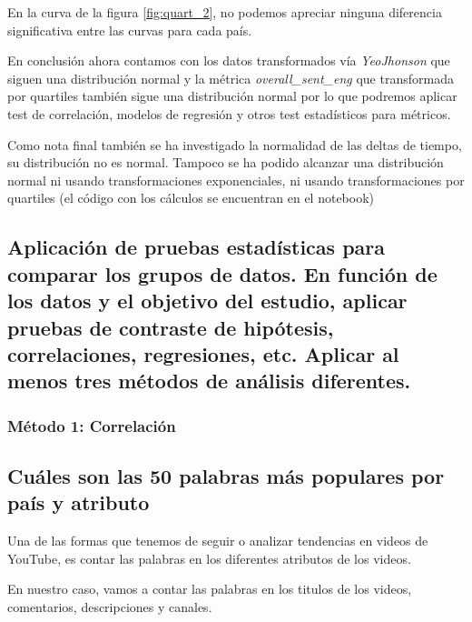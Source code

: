 \documentclass[a4paper,12pt]{article}
\begin{document}
En la curva de la figura \ref{fig:quart_2}, no podemos apreciar ninguna diferencia significativa entre las curvas para cada pa\'is.

En conclusi\'on ahora contamos con los datos transformados  v\'ia {\itshape Yeo\-Jhonson} que siguen una distribuci\'on normal y la m\'etrica {\itshape overall\_sent\_eng} que transformada por quartiles tambi\'en sigue una distribuci\'on normal por lo que podremos aplicar test de correlaci\'on, modelos de regresi\'on y otros test estad\'isticos para m\'etricos.

Como nota final tambi\'en se ha investigado la normalidad de las deltas de tiempo, su distribuci\'on no es normal. Tampoco se ha podido alcanzar una distribuci\'on normal ni usando transformaciones exponenciales, ni usando transformaciones por quartiles (el c\'odigo con los c\'alculos se encuentran en el notebook)

\subsection[item_pruebas]{Aplicaci\'on de pruebas estad\'isticas para comparar los grupos de datos. En funci\'on de los datos y el objetivo del estudio, aplicar pruebas de contraste de hip\'otesis, correlaciones, regresiones, etc. Aplicar al menos tres m\'etodos de an\'alisis diferentes.}


\subsubsection{M\'etodo 1: Correlaci\'on}

\subsection{Cu\'ales son las 50 palabras m\'as populares por pa\'is y atributo}

Una de las formas que tenemos de seguir o analizar tendencias en videos de YouTube, es contar las palabras en los diferentes atributos de los videos.

En nuestro caso, vamos a contar las palabras en los titulos de los videos, comentarios, descripciones y canales.
\end{document}
